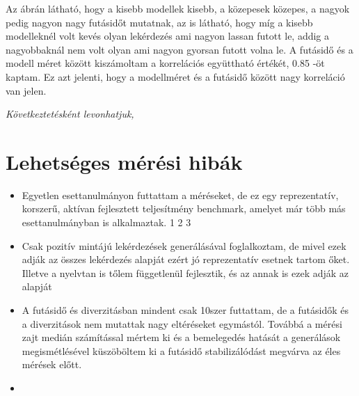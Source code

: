 Az ábrán látható, hogy a kisebb modellek kisebb, a közepesek közepes, a nagyok pedig nagyon nagy futásidőt mutatnak, az is látható, hogy míg a kisebb modelleknél volt kevés olyan lekérdezés ami nagyon lassan futott le, addig a nagyobbaknál nem volt olyan ami nagyon gyorsan futott volna le. A futásidő és a modell méret között kiszámoltam a korrelációs együttható értékét, 0.85 -öt kaptam. Ez azt jelenti, hogy a modellméret és a futásidő között nagy korreláció van jelen.

 
\textit{Következtetésként levonhatjuk, }



\section{Lehetséges mérési hibák}
\begin{itemize}
	\item Egyetlen esettanulmányon futtattam a méréseket, de ez egy reprezentatív, korszerű, aktívan fejlesztett teljesítmény benchmark, amelyet már több más esettanulmányban is alkalmaztak.\cite{} 1 2 3
	\item Csak pozitív mintájú lekérdezések generálásával foglalkoztam, de mivel ezek adják az összes lekérdezés alapját ezért jó reprezentatív esetnek tartom őket. Illetve a nyelvtan is tőlem függetlenül fejlesztik, és az annak is ezek adják az alapját
	\item A futásidő és diverzitásban mindent csak 10szer futtattam, de a futásidők és a diverzitások nem mutattak nagy eltéréseket egymástól. Továbbá a mérési zajt medián számítással mértem ki és a bemelegedés hatását a generálások megismétlésével küszöböltem ki a futásidő stabilizálódást megvárva az éles mérések előtt.
	\item 
	
\end{itemize}




